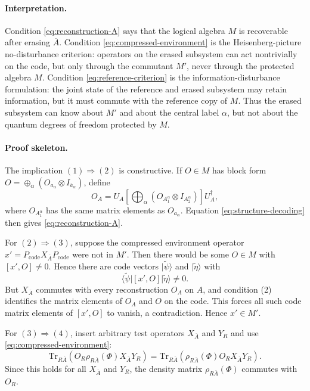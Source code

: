 \documentclass[11pt]{article}
\newcommand{\Tr}{\mathrm{Tr}}
\newcommand{\barA}{\overline{A}}
\newcommand{\bara}{\overline{a}}
\newcommand{\ket}[1]{|#1\rangle}
\newcommand{\bra}[1]{\langle #1|}
\newcommand{\code}{\mathrm{code}}
\newcommand{\wt}[1]{\widetilde{#1}}
\begin{document}
\paragraph{Interpretation.}
Condition \eqref{eq:reconstruction-A} says that the logical algebra \(M\) is
recoverable after erasing \(\barA\).  Condition
\eqref{eq:compressed-environment} is the Heisenberg-picture no-disturbance
criterion: operators on the erased subsystem can act nontrivially on the code,
but only through the commutant \(M'\), never through the protected algebra
\(M\).  Condition \eqref{eq:reference-criterion} is the information-disturbance
formulation: the joint state of the reference and erased subsystem may retain
information, but it must commute with the reference copy of \(M\).  Thus the
erased subsystem can know about \(M'\) and about the central label \(\alpha\),
but not about the quantum degrees of freedom protected by \(M\).

\paragraph{Proof skeleton.}
The implication \((1)\Rightarrow(2)\) is constructive.  If \(O\in M\) has block
form \(O=\oplus_\alpha (O_{a_\alpha}\otimes I_{\bara_\alpha})\), define
\[
    O_A
    =
    U_A
    \left[
    \bigoplus_\alpha
    \left(
    O_{A_1^\alpha}\otimes I_{A_2^\alpha}
    \right)
    \right]
    U_A^\dagger,
\]
where \(O_{A_1^\alpha}\) has the same matrix elements as
\(O_{a_\alpha}\).  Equation \eqref{eq:structure-decoding} then gives
\eqref{eq:reconstruction-A}.

For \((2)\Rightarrow(3)\), suppose the compressed environment operator
\(x'=P_{\code}X_{\barA}P_{\code}\) were not in \(M'\).  Then there would be
some \(O\in M\) with \([x',O]\ne0\).  Hence there are code vectors
\(\ket{\wt{\psi}}\) and \(\ket{\wt{\eta}}\) with
\[
    \bra{\wt{\psi}}[x',O]\ket{\wt{\eta}}\ne0.
\]
But \(X_{\barA}\) commutes with every reconstruction \(O_A\) on \(A\), and
condition (2) identifies the matrix elements of \(O_A\) and \(O\) on the code.
This forces all such code matrix elements of \([x',O]\) to vanish, a
contradiction.  Hence \(x'\in M'\).

For \((3)\Rightarrow(4)\), insert arbitrary test operators
\(X_{\barA}\) and \(Y_R\) and use \eqref{eq:compressed-environment}:
\[
    \Tr_{R\barA}
    \left(
    O_R\rho_{R\barA}(\Phi)X_{\barA}Y_R
    \right)
    =
    \Tr_{R\barA}
    \left(
    \rho_{R\barA}(\Phi)O_RX_{\barA}Y_R
    \right).
\]
Since this holds for all \(X_{\barA}\) and \(Y_R\), the density matrix
\(\rho_{R\barA}(\Phi)\) commutes with \(O_R\).
\end{document}
